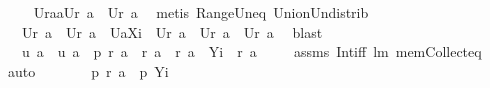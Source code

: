 \begin{isabellebody}
\ \isanewline
\ \ {}{\isacharcolon}\ {\isachardoublequoteopen}{\isacharquery}U{\isacharparenleft}{\isacharquery}r{\isacharparenleft}{\isacharquery}a{}{\isasymunion}{\isacharquery}a{}{\isacharparenright}{\isacharparenright}{\isacharequal}{\isacharquery}U{\isacharparenleft}{\isacharquery}r\ {\isacharquery}a{}{\isacharparenright}\ {\isasymunion}\ {\isacharparenleft}{\isacharquery}U{\isacharparenleft}{\isacharquery}r\ {\isacharquery}a{}{\isacharparenright}{\isacharparenright}{\isachardoublequoteclose}\ \isamarkupfalse%
\ {\isacharparenleft}metis\ Range{\isacharunderscore}Un{\isacharunderscore}eq\ Union{\isacharunderscore}Un{\isacharunderscore}distrib{\isacharparenright}\ \isamarkupfalse%
\ \isanewline
\ \ {}{\isacharcolon}\ {\isachardoublequoteopen}{\isacharquery}U{\isacharparenleft}{\isacharquery}r\ a{\isacharparenright}\ {\isasymsubseteq}\ {\isacharquery}U{\isacharparenleft}{\isacharquery}r\ {\isacharquery}a{}{\isacharparenright}\ {\isasymunion}\ {\isacharquery}U{\isacharparenleft}a{\isacharbackquote}{\isacharbackquote}{\isacharquery}Xi{\isacharparenright}\ {\isacharampersand}\ {\isacharquery}U{\isacharparenleft}{\isacharquery}r\ {\isacharquery}a{}{\isacharparenright}\ {\isasymunion}\ {\isacharquery}U{\isacharparenleft}{\isacharquery}r\ {\isacharquery}a{}{\isacharparenright}\ {\isasymsubseteq}\ {\isacharquery}U{\isacharparenleft}{\isacharquery}r\ a{\isacharparenright}{\isachardoublequoteclose}\ \isamarkupfalse%
\ blast\ \isamarkupfalse%
\isanewline
\ \ {}{\isacharcolon}\ {\isachardoublequoteopen}{\isacharquery}u\ a\ {\isacharampersand}\ {\isacharquery}u\ {\isacharparenleft}a{\isacharcircum}{\isacharminus}{}{\isacharparenright}\ {\isacharampersand}\ {\isacharquery}p\ {\isacharparenleft}{\isacharquery}r\ a{\isacharparenright}\ {\isacharampersand}\ {\isacharquery}r\ {\isacharquery}a{}\ {\isasymsubseteq}\ {\isacharquery}r\ a\ {\isacharampersand}\ {\isacharquery}Yi\ {\isasymsubseteq}\ {\isacharquery}r\ a{\isachardoublequoteclose}\ \isanewline
\ \ \isamarkupfalse%
\ assms\ Int{\isacharunderscore}iff\ lm{}{}\ mem{\isacharunderscore}Collect{\isacharunderscore}eq\ \isamarkupfalse%
\ auto\ \isamarkupfalse%
\ \isamarkupfalse%
\ \isanewline
\ \ {}{\isacharcolon}\ {\isachardoublequoteopen}{\isacharquery}p\ {\isacharparenleft}{\isacharquery}r\ {\isacharquery}a{}{\isacharparenright}\ {\isacharampersand}\ {\isacharquery}p\ {\isacharquery}Yi{\isachardoublequoteclose}\ \isamarkupfalse%

\end{isabellebody}
